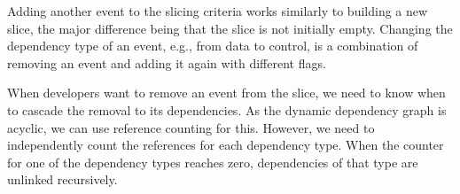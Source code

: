 Adding another event to the slicing criteria works similarly to building a new slice, the major difference being that the slice is not initially empty.
Changing the dependency type of an event, e.g., from data to control, is a combination of removing an event and adding it again with different flags.

When developers want to remove an event from the slice, we need to know when to cascade the removal to its dependencies.
As the dynamic dependency graph is acyclic, we can use reference counting for this.
However, we need to independently count the references for each dependency type.
When the counter for one of the dependency types reaches zero, dependencies of that type are unlinked recursively.

\tmpEnd








